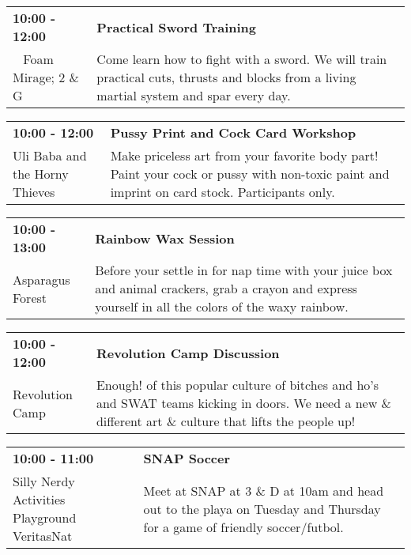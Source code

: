 \begin{tabular}{ p{1in} p{2.2in} }
    \textbf{10:00 - 12:00} & \textbf{Practical Sword Training} \\
    ~ \newline Foam Mirage; 2 \& G & Come learn how to fight with a sword. We will train practical cuts, thrusts and blocks from a living martial system and spar every day. \\
    \hline 
\end{tabular}
    
\begin{tabular}{ p{1in} p{2.2in} }
    \textbf{10:00 - 12:00} & \textbf{Pussy Print and Cock Card Workshop} \\
    Uli Baba and the Horny Thieves \newline  & Make priceless art from your favorite body part! Paint your cock or
pussy with non-toxic paint and imprint on card stock. Participants
only. \\
    \hline 
\end{tabular}
    
\begin{tabular}{ p{1in} p{2.2in} }
    \textbf{10:00 - 13:00} & \textbf{Rainbow Wax Session} \\
    Asparagus Forest \newline  & Before your settle in for nap time with your juice box and animal crackers, grab a crayon and express yourself in all the colors of the waxy rainbow. \\
    \hline 
\end{tabular}
    
\begin{tabular}{ p{1in} p{2.2in} }
    \textbf{10:00 - 12:00} & \textbf{Revolution Camp Discussion} \\
    Revolution Camp \newline  & Enough! of this popular culture of bitches and ho's and SWAT teams kicking in doors. We need a new \& different art \& culture that lifts the people up! \\
    \hline 
\end{tabular}
    
\begin{tabular}{ p{1in} p{2.2in} }
    \textbf{10:00 - 11:00} & \textbf{SNAP Soccer} \\
    Silly Nerdy Activities Playground \newline VeritasNat & Meet at SNAP at 3 \& D at 10am and head out to the playa on Tuesday and Thursday for a game of friendly soccer/futbol. \\
    \hline 
\end{tabular}
    
